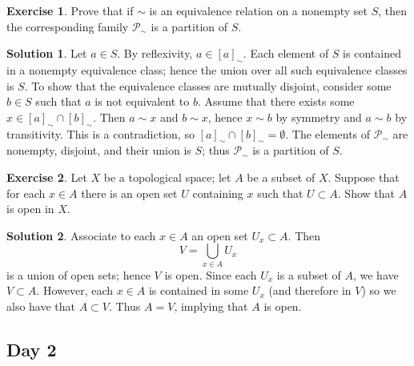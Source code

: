 \documentclass{article}
\theoremstyle{definition}
\newtheorem{exercise}{Exercise}
\newtheorem*{solution}{Solution}
\begin{document}
\begin{exercise}
    Prove that if \(\sim\) is an equivalence relation on a nonempty set \(S\), then the corresponding family \(\mathscr{P}_\sim\) is a partition of \(S\).
\end{exercise}
\begin{solution}
    Let \(a\in S\). By reflexivity, \(a\in[a]_\sim\). Each element of \(S\) is contained in a nonempty equivalence class; hence the union over all such equivalence classes is \(S\). To show that the equivalence classes are mutually disjoint, consider some \(b\in S\) such that \(a\) is not equivalent to \(b\). Assume that there exists some \(x\in [a]_\sim\cap[b]_\sim\). Then \(a\sim x\) and \(b\sim x\), hence \(x\sim b\) by symmetry and \(a\sim b\) by transitivity. This is a contradiction, so \([a]_\sim\cap[b]_\sim=\emptyset\). The elements of \(\mathscr{P}_\sim\) are nonempty, disjoint, and their union is \(S\); thus \(\mathscr{P}_\sim\) is a partition of \(S\).
\end{solution}

\begin{exercise}
    Let \(X\) be a topological space; let \(A\) be a subset of \(X\). Suppose that for each \(x\in A\) there is an open set \(U\) containing \(x\) such that \(U\subset A\). Show that \(A\) is open in \(X\).
\end{exercise}
\begin{solution}
    Associate to each \(x\in A\) an open set \(U_x\subset A\). Then
    \[V=\bigcup_{x\in A} U_x\]
    is a union of open sets; hence \(V\) is open. Since each \(U_x\) is a subset of \(A\), we have \(V\subset A\). However, each \(x\in A\) is contained in some \(U_x\) (and therefore in \(V\)) so we also have that \(A\subset V\). Thus \(A=V\), implying that \(A\) is open.
\end{solution}

\subsection*{Day 2}
\end{document}
